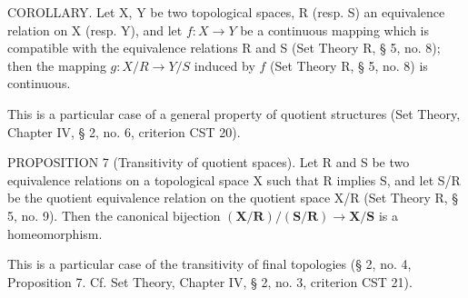 COROLLARY. Let X, Y be two topological spaces, R (resp. S) an equivalence relation on X (resp. Y), and let \(f: X \to Y\) be a continuous mapping which is compatible with the equivalence relations R and S (Set Theory R, § 5, no. 8); then the mapping \(g: X/R \to Y/S\) induced by \(f\) (Set Theory R, § 5, no. 8) is continuous.

This is a particular case of a general property of quotient structures (Set Theory, Chapter IV, § 2, no. 6, criterion CST 20).

PROPOSITION 7 (Transitivity of quotient spaces). Let R and S be two equivalence relations on a topological space X such that R implies S, and let S/R be the quotient equivalence relation on the quotient space X/R (Set Theory R, § 5, no. 9). Then the canonical bijection \((\mathbf{X}/\mathbf{R})/(\mathbf{S}/\mathbf{R}) \to \mathbf{X}/\mathbf{S}\) is a homeomorphism.

This is a particular case of the transitivity of final topologies (§ 2, no. 4, Proposition 7. Cf. Set Theory, Chapter IV, § 2, no. 3, criterion CST 21).

